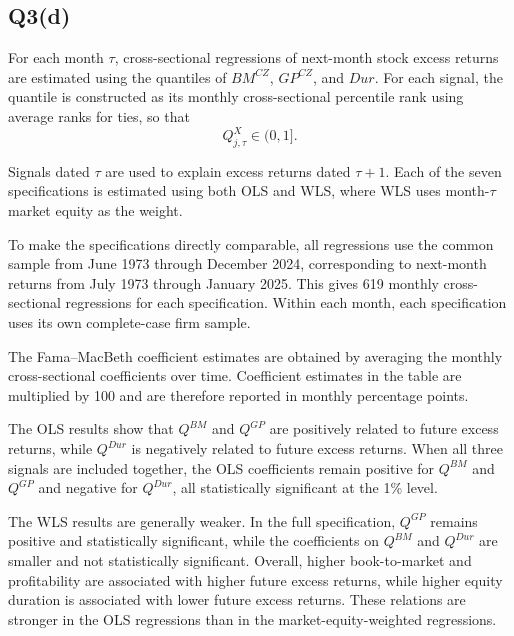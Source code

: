 \documentclass{article}
\begin{document}
\newpage

\subsection{Q3(d)}

For each month \(\tau\), cross-sectional regressions of next-month stock excess returns are estimated using the quantiles of \(BM^{CZ}\), \(GP^{CZ}\), and \(Dur\). For each signal, the quantile is constructed as its monthly cross-sectional percentile rank using average ranks for ties, so that
\[
Q^X_{j,\tau}\in(0,1].
\]

Signals dated \(\tau\) are used to explain excess returns dated \(\tau+1\). Each of the seven specifications is estimated using both OLS and WLS, where WLS uses month-\(\tau\) market equity as the weight.

To make the specifications directly comparable, all regressions use the common sample from June 1973 through December 2024, corresponding to next-month returns from July 1973 through January 2025. This gives 619 monthly cross-sectional regressions for each specification. Within each month, each specification uses its own complete-case firm sample.

The Fama--MacBeth coefficient estimates are obtained by averaging the monthly cross-sectional coefficients over time. Coefficient estimates in the table are multiplied by 100 and are therefore reported in monthly percentage points. 



The OLS results show that \(Q^{BM}\) and \(Q^{GP}\) are positively related to future excess returns, while \(Q^{Dur}\) is negatively related to future excess returns. When all three signals are included together, the OLS coefficients remain positive for \(Q^{BM}\) and \(Q^{GP}\) and negative for \(Q^{Dur}\), all statistically significant at the 1\% level. 

The WLS results are generally weaker. In the full specification, \(Q^{GP}\) remains positive and statistically significant, while the coefficients on \(Q^{BM}\) and \(Q^{Dur}\) are smaller and not statistically significant. Overall, higher book-to-market and profitability are associated with higher future excess returns, while higher equity duration is associated with lower future excess returns. These relations are stronger in the OLS regressions than in the market-equity-weighted regressions.


\newpage
\end{document}
